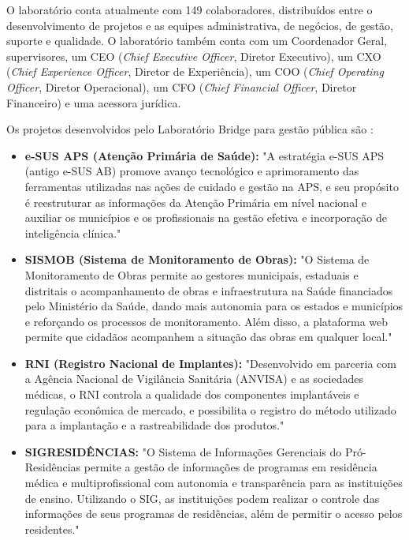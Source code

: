 \documentclass[
    12pt,       %
    openright,      %
    twoside,      %
    a4paper,      %
    english,      %
    french,       %
    spanish,      %
    brazil,       %
    ]{abntex2}
\begin{document}
O laboratório conta atualmente com 149 colaboradores, distribuídos entre o desenvolvimento de projetos e as equipes administrativa, de negócios, de gestão, suporte e qualidade. O laboratório também conta com um Coordenador Geral, supervisores, um CEO (\textit{Chief Executive Officer}, Diretor Executivo), um CXO (\textit{Chief Experience Officer}, Diretor de Experiência), um COO (\textit{Chief Operating Officer}, Diretor Operacional), um CFO (\textit{Chief Financial Officer}, Diretor Financeiro) e uma acessora jurídica.

Os projetos desenvolvidos pelo Laboratório Bridge para gestão pública são \cite{Bridge:2022}:
\begin{itemize}
    \item \textbf{e-SUS APS (Atenção Primária de Saúde):} "A estratégia e-SUS APS (antigo e-SUS AB) promove avanço tecnológico e aprimoramento das ferramentas utilizadas nas ações de cuidado e gestão na APS, e seu propósito é reestruturar as informações da Atenção Primária em nível nacional e auxiliar os municípios e os profissionais na gestão efetiva e incorporação de inteligência clínica."
    
    \item \textbf{SISMOB (Sistema de Monitoramento de Obras):} "O Sistema de Monitoramento de Obras permite ao gestores municipais, estaduais e distritais o acompanhamento de obras e infraestrutura na Saúde financiados pelo Ministério da Saúde, dando mais autonomia para os estados e municípios e reforçando os processos de monitoramento. Além disso, a plataforma web permite que cidadãos acompanhem a situação das obras em qualquer local."
    
    \item \textbf{RNI (Registro Nacional de Implantes):} "Desenvolvido em parceria com a Agência Nacional de Vigilância Sanitária (ANVISA) e as sociedades médicas, o RNI controla a qualidade dos componentes implantáveis e regulação econômica de mercado, e possibilita o registro do método utilizado para a implantação e a rastreabilidade dos produtos."
    
    \item \textbf{SIGRESIDÊNCIAS:} "O Sistema de Informações Gerenciais do Pró-Residências permite a gestão de informações de programas em residência médica e multiprofissional com autonomia e transparência para as instituições de ensino. Utilizando o SIG, as instituições podem realizar o controle das informações de seus programas de residências, além de permitir o acesso pelos residentes."
    

\end{itemize}
\end{document}
